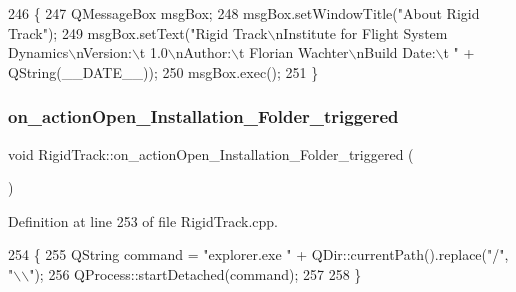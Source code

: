 \begin{DoxyCode}
246 \{
247     QMessageBox msgBox;
248     msgBox.setWindowTitle(\textcolor{stringliteral}{"About Rigid Track"});
249     msgBox.setText(\textcolor{stringliteral}{"Rigid Track\(\backslash\)nInstitute for Flight System Dynamics\(\backslash\)nVersion:\(\backslash\)t 1.0\(\backslash\)nAuthor:\(\backslash\)t Florian
       Wachter\(\backslash\)nBuild Date:\(\backslash\)t "} + QString(\_\_DATE\_\_));
250     msgBox.exec();
251 \}
\end{DoxyCode}
\mbox{\label{class_rigid_track_a7d858fcf6c9fe852ee3facfe6588aec1}} 
\subsubsection{\texorpdfstring{on\+\_\+action\+Open\+\_\+\+Installation\+\_\+\+Folder\+\_\+triggered}{on\_actionOpen\_Installation\_Folder\_triggered}}
{\footnotesize\ttfamily void Rigid\+Track\+::on\+\_\+action\+Open\+\_\+\+Installation\+\_\+\+Folder\+\_\+triggered (\begin{DoxyParamCaption}{ }\end{DoxyParamCaption})\hspace{0.3cm}{\ttfamily [slot]}}



Definition at line 253 of file Rigid\+Track.\+cpp.


\begin{DoxyCode}
254 \{
255     QString command = \textcolor{stringliteral}{"explorer.exe "} + QDir::currentPath().replace(\textcolor{stringliteral}{"/"}, \textcolor{stringliteral}{"\(\backslash\)\(\backslash\)"});
256     QProcess::startDetached(command);
257     
258 \}
\end{DoxyCode}
\mbox{\label{class_rigid_track_a63a85d33ef48741b0e671ebbbd43083a}} 
